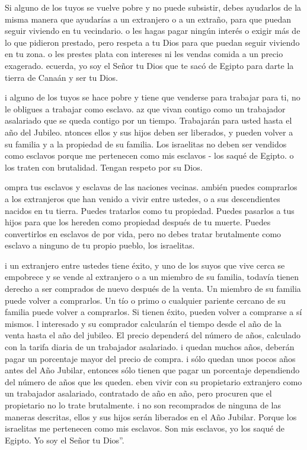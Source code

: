  Si alguno de los tuyos se vuelve pobre y no puede
subsistir, debes ayudarlos de la misma manera que ayudarías a un
extranjero o a un extraño, para que puedan seguir viviendo en tu
vecindario.  o les hagas pagar ningún interés o exigir más
de lo que pidieron prestado, pero respeta a tu Dios para que puedan
seguir viviendo en tu zona.  o les prestes plata con
intereses ni les vendas comida a un precio exagerado. 
ecuerda, yo soy el Señor tu Dios que te sacó de Egipto para darte la
tierra de Canaán y ser tu Dios.

 i alguno de los tuyos se hace pobre y tiene que venderse
para trabajar para ti, no le obligues a trabajar como esclavo.
 az que vivan contigo como un trabajador asalariado que se
queda contigo por un tiempo. Trabajarán para usted hasta el año del
Jubileo.  ntonces ellos y sus hijos deben ser liberados, y
pueden volver a su familia y a la propiedad de su familia. 
Los israelitas no deben ser vendidos como esclavos porque me pertenecen
como mis esclavos - los saqué de Egipto.  o los traten con
brutalidad. Tengan respeto por su Dios.

 ompra tus esclavos y esclavas de las naciones vecinas.
 ambién puedes comprarlos a los extranjeros que han venido
a vivir entre ustedes, o a sus descendientes nacidos en tu tierra.
Puedes tratarlos como tu propiedad.  Puedes pasarlos a tus
hijos para que los hereden como propiedad después de tu muerte. Puedes
convertirlos en esclavos de por vida, pero no debes tratar brutalmente
como esclavo a ninguno de tu propio pueblo, los israelitas.

 i un extranjero entre ustedes tiene éxito, y uno de los
suyos que vive cerca se empobrece y se vende al extranjero o a un
miembro de su familia,  todavía tienen derecho a ser
comprados de nuevo después de la venta. Un miembro de su familia puede
volver a comprarlos.  Un tío o primo o cualquier pariente
cercano de su familia puede volver a comprarlos. Si tienen éxito, pueden
volver a comprarse a sí mismos.  l interesado y su
comprador calcularán el tiempo desde el año de la venta hasta el año del
jubileo. El precio dependerá del número de años, calculado con la tarifa
diaria de un trabajador asalariado.  i quedan muchos años,
deberán pagar un porcentaje mayor del precio de compra.  i
sólo quedan unos pocos años antes del Año Jubilar, entonces sólo tienen
que pagar un porcentaje dependiendo del número de años que les queden.
 eben vivir con su propietario extranjero como un
trabajador asalariado, contratado de año en año, pero procuren que el
propietario no lo trate brutalmente.  i no son recomprados
de ninguna de las maneras descritas, ellos y sus hijos serán liberados
en el Año Jubilar.  Porque los israelitas me pertenecen
como mis esclavos. Son mis esclavos, yo los saqué de Egipto. Yo soy el
Señor tu Dios''.

